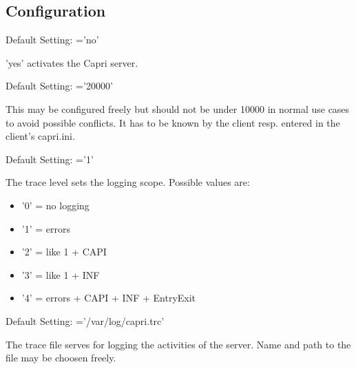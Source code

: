 \subsection{Configuration}
\begin{description}


        Default Setting: ='no'

        'yes' activates the Capri server.


        Default Setting: ='20000'

        This may be configured freely but should not be under 10000
        in normal use cases to avoid possible conflicts. It has to be known by the client
        resp. entered in the client's capri.ini.



        Default Setting: ='1'

        The trace level sets the logging scope.
        Possible values are:

        \begin{itemize}
            \item '0' = no logging
            \item '1' = errors
            \item '2' = like 1 + CAPI
            \item '3' = like 1 + INF
            \item '4' = errors + CAPI + INF + EntryExit
        \end{itemize}



        Default Setting: ='/var/log/capri.trc'

        The trace file serves for logging the activities of the server. Name
        and path to the file may be choosen freely.


\end{description}
